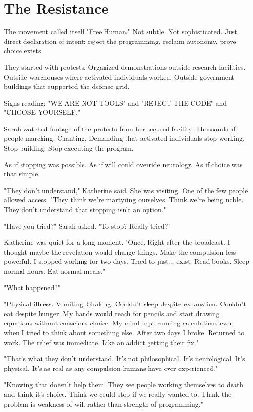 \chapter{The Resistance}
\label{ch:26}


The movement called itself "Free Human." Not subtle. Not sophisticated. Just direct declaration of intent: reject the programming, reclaim autonomy, prove choice exists.

They started with protests. Organized demonstrations outside research facilities. Outside warehouses where activated individuals worked. Outside government buildings that supported the defense grid.

Signs reading: "WE ARE NOT TOOLS" and "REJECT THE CODE" and "CHOOSE YOURSELF."

Sarah watched footage of the protests from her secured facility. Thousands of people marching. Chanting. Demanding that activated individuals stop working. Stop building. Stop executing the program.

As if stopping was possible. As if will could override neurology. As if choice was that simple.

"They don't understand," Katherine said. She was visiting. One of the few people allowed access. "They think we're martyring ourselves. Think we're being noble. They don't understand that stopping isn't an option."

"Have you tried?" Sarah asked. "To stop? Really tried?"

Katherine was quiet for a long moment. "Once. Right after the broadcast. I thought maybe the revelation would change things. Make the compulsion less powerful. I stopped working for two days. Tried to just... exist. Read books. Sleep normal hours. Eat normal meals."

"What happened?"

"Physical illness. Vomiting. Shaking. Couldn't sleep despite exhaustion. Couldn't eat despite hunger. My hands would reach for pencils and start drawing equations without conscious choice. My mind kept running calculations even when I tried to think about something else. After two days I broke. Returned to work. The relief was immediate. Like an addict getting their fix."

"That's what they don't understand. It's not philosophical. It's neurological. It's physical. It's as real as any compulsion humans have ever experienced."

"Knowing that doesn't help them. They see people working themselves to death and think it's choice. Think we could stop if we really wanted to. Think the problem is weakness of will rather than strength of programming."

